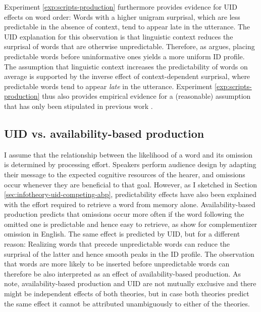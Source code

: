 Experiment \ref{exp:scripts-production} furthermore provides evidence for UID effects on word order: Words with a higher unigram surprisal, which are less predictable in the absence of context, tend to appear late in the utterance. The UID explanation for this observation is that linguistic context reduces the surprisal of words that are otherwise unpredictable. Therefore, as \citet{fenk-oczlon1983} argues, placing predictable words before uninformative ones yields a more uniform ID profile. The assumption that linguistic context increases the predictability of words on average is supported by the inverse effect of context-dependent surprisal, where predictable words tend to appear \textit{late} in the utterance. Experiment \ref{exp:scripts-production} thus also provides empirical evidence for a (reasonable) assumption that has only been stipulated in previous work \citep{fenk-oczlon1983, fenk-oczlon1989, genzel.charniak2002}.

\subsection{UID vs. availability-based production}

I assume that the relationship between the likelihood of a word and its omission is determined by processing effort. Speakers perform audience design by adapting their message to  the expected cognitive resources of the hearer, and omissions occur whenever they are beneficial to that goal. However, as I sketched in Section \ref{sec:infotheory-uid-competing-abp}, predictability effects have also been explained with the effort required to retrieve a word from memory alone. Availability-based production predicts that omissions occur more often if the word following the omitted one is predictable and hence easy to retrieve, as \citet{ferreira.dell2000} show for complementizer omission in English. The same effect is predicted by UID, but for a different reason: Realizing words that precede unpredictable words can reduce the surprisal of the latter and hence smooth peaks in the ID profile. The observation that words are more likely to be inserted before unpredictable words can therefore be also interpreted as an effect of availability-based production. As \citet{jaeger.buz2017} note, availability-based production and UID are not mutually exclusive and there might be independent effects of both theories, but in case both theories predict the same effect it cannot be attributed unambiguously to either of the theories.

